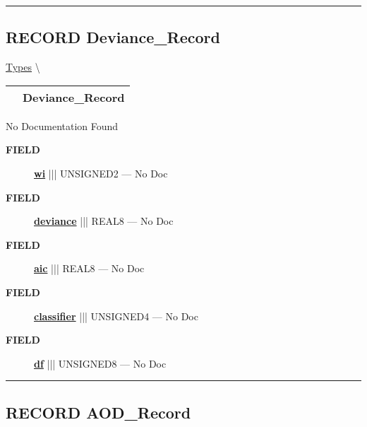 \rule{\linewidth}{0.5pt}
\subsection*{\textsf{\colorbox{headtoc}{\color{white} RECORD}
Deviance\_Record}}

\hypertarget{ecldoc:logisticregression.types.deviance_record}{}
\hspace{0pt} \hyperlink{ecldoc:LogisticRegression.Types}{Types} \textbackslash 

{\renewcommand{\arraystretch}{1.5}
\begin{tabularx}{\textwidth}{|>{\raggedright\arraybackslash}l|X|}
\hline
\hspace{0pt}\mytexttt{\color{red} } & \textbf{Deviance\_Record} \\
\hline
\end{tabularx}
}

\par





No Documentation Found







\par
\begin{description}
\item [\colorbox{tagtype}{\color{white} \textbf{\textsf{FIELD}}}] \textbf{\underline{wi}} ||| UNSIGNED2 --- No Doc
\item [\colorbox{tagtype}{\color{white} \textbf{\textsf{FIELD}}}] \textbf{\underline{deviance}} ||| REAL8 --- No Doc
\item [\colorbox{tagtype}{\color{white} \textbf{\textsf{FIELD}}}] \textbf{\underline{aic}} ||| REAL8 --- No Doc
\item [\colorbox{tagtype}{\color{white} \textbf{\textsf{FIELD}}}] \textbf{\underline{classifier}} ||| UNSIGNED4 --- No Doc
\item [\colorbox{tagtype}{\color{white} \textbf{\textsf{FIELD}}}] \textbf{\underline{df}} ||| UNSIGNED8 --- No Doc
\end{description}





\rule{\linewidth}{0.5pt}
\subsection*{\textsf{\colorbox{headtoc}{\color{white} RECORD}
AOD\_Record}}

